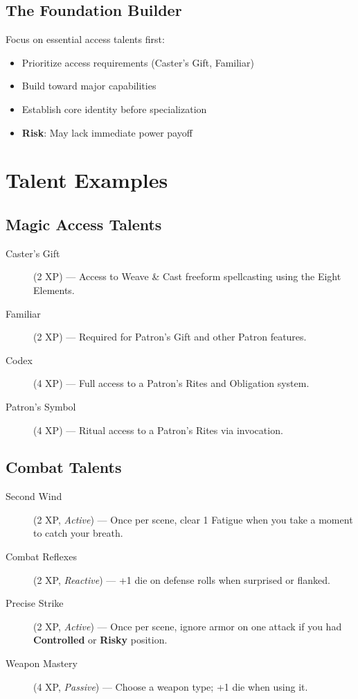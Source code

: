 \subsection*{The Foundation Builder}
Focus on essential access talents first:
\begin{itemize}
\item Prioritize access requirements (Caster's Gift, Familiar)
\item Build toward major capabilities
\item Establish core identity before specialization
\item \textbf{Risk}: May lack immediate power payoff
\end{itemize}

\section{Talent Examples}

\subsection*{Magic Access Talents}
\begin{description}
\item[Caster's Gift] (2 XP) --- Access to Weave \& Cast freeform spellcasting using the Eight Elements.
\item[Familiar] (2 XP) --- Required for Patron's Gift and other Patron features.
\item[Codex] (4 XP) --- Full access to a Patron's Rites and Obligation system.
\item[Patron's Symbol] (4 XP) --- Ritual access to a Patron's Rites via invocation.
\end{description}

\subsection*{Combat Talents}
\begin{description}
\item[Second Wind] (2 XP, \emph{Active}) --- Once per scene, clear 1 Fatigue when you take a moment to catch your breath.
\item[Combat Reflexes] (2 XP, \emph{Reactive}) --- +1 die on defense rolls when surprised or flanked.
\item[Precise Strike] (2 XP, \emph{Active}) --- Once per scene, ignore armor on one attack if you had \textbf{Controlled} or \textbf{Risky} position.
\item[Weapon Mastery] (4 XP, \emph{Passive}) --- Choose a weapon type; +1 die when using it.
\end{description}

